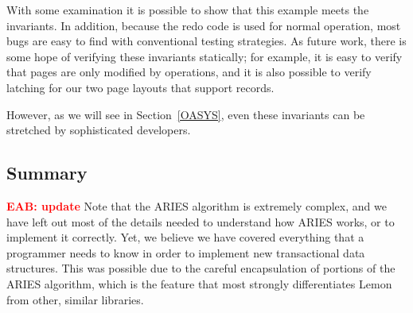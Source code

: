 \documentclass[letterpaper,twocolumn,english]{article}
\newcommand{\yad}{Lemon\xspace}
\newcommand{\eab}[1]{\textcolor{red}{\bf EAB: #1}}
\begin{document}
With some examination it is possible to show that this example meets
the invariants.  In addition, because the redo code is used for normal
operation, most bugs are easy to find with conventional testing
strategies.  As future work, there is some hope of verifying these
invariants statically; for example, it is easy to verify that pages
are only modified by operations, and it is also possible to verify
latching for our two page layouts that support records.


However, as we will see in Section~\ref{OASYS}, even these invariants
can be stretched by sophisticated developers.

\subsection{Summary}

\eab{update}
Note that the ARIES algorithm is extremely complex, and we have left
out most of the details needed to understand how ARIES works, or to
implement it correctly.  Yet, we believe we have covered everything
that a programmer needs to know in order to implement new
transactional data structures.  This was possible due to the careful
encapsulation of portions of the ARIES algorithm, which is the feature
that most strongly differentiates \yad from other, similar libraries.








\end{document}

